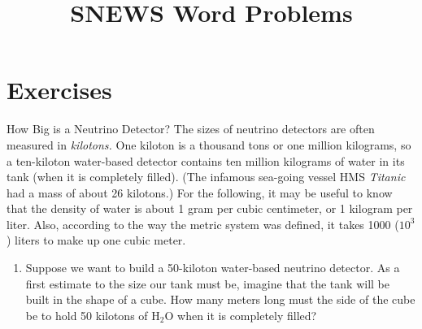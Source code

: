\documentclass[12pt]{article}
\begin{document}
\title{SNEWS Word Problems}
\author{}
\date{}
\maketitle

\section{Exercises}

\begin{probdesc}{1}{How Big is a Neutrino Detector?}
The sizes of neutrino detectors are often measured in {\em kilotons.}
One kiloton is a thousand tons or one million kilograms, so a
ten-kiloton water-based detector contains ten million kilograms of
water in its tank (when it is completely filled).  (The infamous
sea-going vessel HMS {\em Titanic} had a mass of about 26 kilotons.)
For the following, it may be useful to know that the density of water
is about 1 gram per cubic centimeter, or 1 kilogram per liter.  Also,
according to the way the metric system was defined, it takes 1000
($10^3$) liters to make up one cubic meter.

\begin{enumerate}
\item[(a)] Suppose we want to build a 50-kiloton water-based neutrino
  detector.  As a first estimate to the size our tank must be, imagine
  that the tank will be built in the shape of a cube.  How many meters
  long must the side of the cube be to hold 50 kilotons of H$_2$O when
  it is completely filled?

\end{enumerate}

\end{probdesc}
\end{document}
